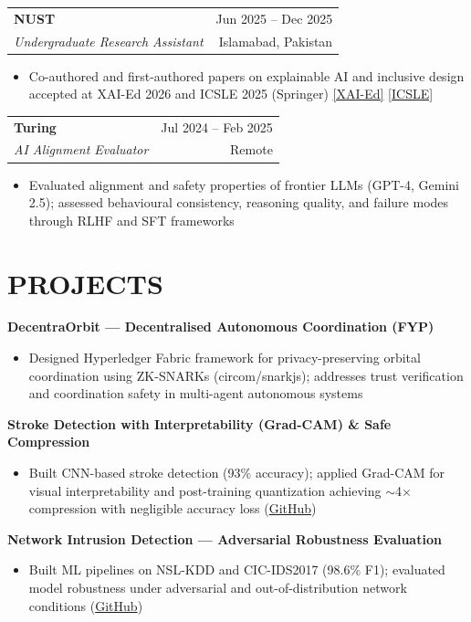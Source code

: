 \documentclass[letterpaper,9pt]{article}
\makeatletter
\newcommand{\resumeItem}[1]{
  \item \small{#1}
}
\newcommand{\resumeSubheading}[4]{
  \vspace{0pt}
  \begin{tabular*}{\textwidth}{l@{\extracolsep{\fill}}r}
    \textbf{\small #1} & {\color{dark-grey}\small #2} \\
    \textit{\small #3} & {\color{dark-grey}\small #4} \\
  \end{tabular*}
  \vspace{-5pt}
}
\newcommand{\resumeProjectHeading}[1]{
  \vspace{1pt}
  \textbf{\small #1}
  \vspace{-1pt}
}
\makeatother
\begin{document}
\resumeSubheading{NUST}{Jun 2025 -- Dec 2025}{Undergraduate Research Assistant}{Islamabad, Pakistan}
\begin{itemize}
\resumeItem{Co-authored and first-authored papers on explainable AI and inclusive design accepted at XAI-Ed 2026 and ICSLE 2025 (Springer) \href{https://www.xai-ed.net/papers/XAI-Ed_2026_paper_1.pdf}{[XAI-Ed]} \href{https://www.researchgate.net/publication/395837132_Barrier-Based_Inclusive_Design_in_VR_Addressing_DEI_Challenges_through_the_UDL_30_Framework}{[ICSLE]}}
\end{itemize}

\resumeSubheading{Turing}{Jul 2024 -- Feb 2025}{AI Alignment Evaluator}{Remote}
\begin{itemize}
\resumeItem{Evaluated alignment and safety properties of frontier LLMs (GPT-4, Gemini 2.5); assessed behavioural consistency, reasoning quality, and failure modes through RLHF and SFT frameworks}
\end{itemize}

\section{PROJECTS}

\resumeProjectHeading{DecentraOrbit — Decentralised Autonomous Coordination (FYP)}
\begin{itemize}
\resumeItem{Designed Hyperledger Fabric framework for privacy-preserving orbital coordination using ZK-SNARKs (circom/snarkjs); addresses trust verification and coordination safety in multi-agent autonomous systems}
\end{itemize}

\resumeProjectHeading{Stroke Detection with Interpretability (Grad-CAM) \& Safe Compression}
\begin{itemize}
\resumeItem{Built CNN-based stroke detection (93\% accuracy); applied Grad-CAM for visual interpretability and post-training quantization achieving $\sim$4$\times$ compression with negligible accuracy loss (\href{https://github.com/92meharali}{GitHub})}
\end{itemize}

\resumeProjectHeading{Network Intrusion Detection — Adversarial Robustness Evaluation}
\begin{itemize}
\resumeItem{Built ML pipelines on NSL-KDD and CIC-IDS2017 (98.6\% F1); evaluated model robustness under adversarial and out-of-distribution network conditions (\href{https://github.com/92meharali}{GitHub})}
\end{itemize}
\end{document}
